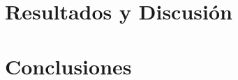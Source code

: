 \documentclass[12pt, twoside, openany]{book}
\begin{document}
    \chapter{Resultados y Discusión}
    \label{chap:results}
    

    \chapter{Conclusiones}
    \label{chap:conclusions}
    

    \nocite{*}
    
    

    \appendix
    \clearpage
    \addappheadtotoc
    \appendixpage

    
\end{document}
